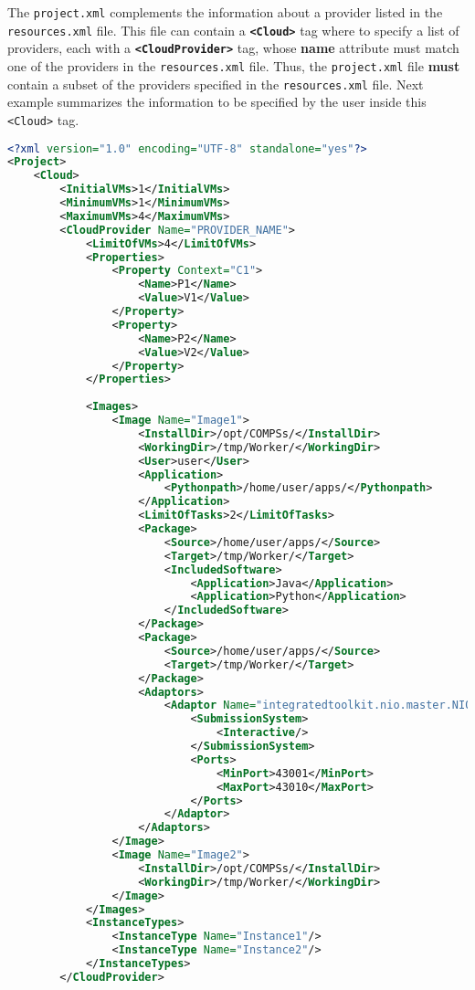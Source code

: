 The \texttt{project.xml} complements the information about a provider listed in the \texttt{resources.xml} file. 
This file can contain a \textbf{\texttt{<Cloud>}} tag where to specify a list of providers, each with a 
\textbf{\texttt{<CloudProvider>}} tag, whose \textbf{name} attribute must match one of the providers in the 
\texttt{resources.xml} file. Thus, the \texttt{project.xml} file \textbf{must} contain a subset of the providers
specified in the \texttt{resources.xml} file. Next example summarizes the information to be specified by the user
inside this \texttt{<Cloud>} tag.

\begin{lstlisting}[language=xml]
<?xml version="1.0" encoding="UTF-8" standalone="yes"?>
<Project>
    <Cloud>
        <InitialVMs>1</InitialVMs>
        <MinimumVMs>1</MinimumVMs>
        <MaximumVMs>4</MaximumVMs>
        <CloudProvider Name="PROVIDER_NAME">
            <LimitOfVMs>4</LimitOfVMs>
            <Properties>
                <Property Context="C1">
                    <Name>P1</Name>
                    <Value>V1</Value>
                </Property>
                <Property>
                    <Name>P2</Name>
                    <Value>V2</Value>
                </Property>
            </Properties>
            
            <Images>
                <Image Name="Image1">
                    <InstallDir>/opt/COMPSs/</InstallDir>
                    <WorkingDir>/tmp/Worker/</WorkingDir>
                    <User>user</User>
                    <Application>
                        <Pythonpath>/home/user/apps/</Pythonpath>
                    </Application>
                    <LimitOfTasks>2</LimitOfTasks>
                    <Package>
                        <Source>/home/user/apps/</Source>
                        <Target>/tmp/Worker/</Target>
                        <IncludedSoftware>
                            <Application>Java</Application>
                            <Application>Python</Application>
                        </IncludedSoftware>
                    </Package>
                    <Package>
                        <Source>/home/user/apps/</Source>
                        <Target>/tmp/Worker/</Target>
                    </Package>
                    <Adaptors>
                        <Adaptor Name="integratedtoolkit.nio.master.NIOAdaptor">
                            <SubmissionSystem>
                                <Interactive/>
                            </SubmissionSystem>
                            <Ports>
                                <MinPort>43001</MinPort>
                                <MaxPort>43010</MaxPort>
                            </Ports>
                        </Adaptor>
                    </Adaptors>
                </Image>
                <Image Name="Image2">
                    <InstallDir>/opt/COMPSs/</InstallDir>
                    <WorkingDir>/tmp/Worker/</WorkingDir>
                </Image>
            </Images>
            <InstanceTypes>
                <InstanceType Name="Instance1"/>
                <InstanceType Name="Instance2"/>
            </InstanceTypes>
        </CloudProvider>
        

\end{lstlisting}
